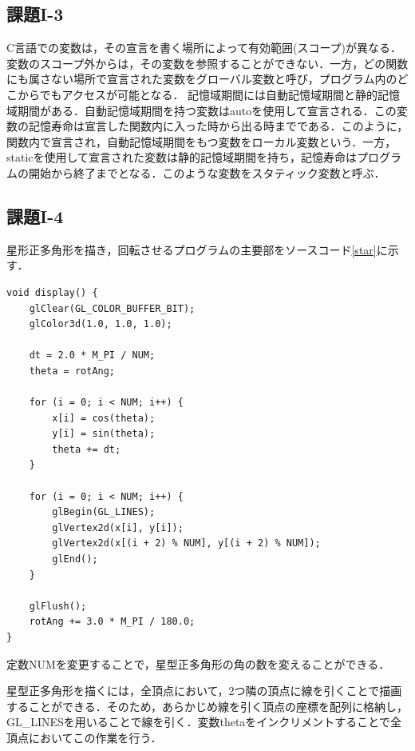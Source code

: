 \documentclass[]{jsarticle}
\begin{document}
\subsection{課題I-3}
C言語での変数は，その宣言を書く場所によって有効範囲(スコープ)が異なる．変数のスコープ外からは，その変数を参照することができない．一方，どの関数にも属さない場所で宣言された変数をグローバル変数と呼び，プログラム内のどこからでもアクセスが可能となる．
記憶域期間には自動記憶域期間と静的記憶域期間がある．自動記憶域期間を持つ変数はautoを使用して宣言される．この変数の記憶寿命は宣言した関数内に入った時から出る時までである．このように，関数内で宣言され，自動記憶域期間をもつ変数をローカル変数という．一方，staticを使用して宣言された変数は静的記憶域期間を持ち，記憶寿命はプログラムの開始から終了までとなる．このような変数をスタティック変数と呼ぶ．

\subsection{課題I-4}
星形正多角形を描き，回転させるプログラムの主要部をソースコード\ref{star}に示す．
\begin{lstlisting}[caption=星形正多角形の描画と回転,label=star]
void display() {
    glClear(GL_COLOR_BUFFER_BIT);
    glColor3d(1.0, 1.0, 1.0);

    dt = 2.0 * M_PI / NUM;
    theta = rotAng;
    
    for (i = 0; i < NUM; i++) {
        x[i] = cos(theta);
        y[i] = sin(theta);
        theta += dt;
    }

    for (i = 0; i < NUM; i++) {
        glBegin(GL_LINES);
        glVertex2d(x[i], y[i]);
        glVertex2d(x[(i + 2) % NUM], y[(i + 2) % NUM]);
        glEnd();
    }

    glFlush();
    rotAng += 3.0 * M_PI / 180.0;
}
\end{lstlisting}
定数NUMを変更することで，星型正多角形の角の数を変えることができる．

星型正多角形を描くには，全頂点において，2つ隣の頂点に線を引くことで描画することができる．そのため，あらかじめ線を引く頂点の座標を配列に格納し，GL\_LINESを用いることで線を引く．変数thetaをインクリメントすることで全頂点においてこの作業を行う．
\end{document}

